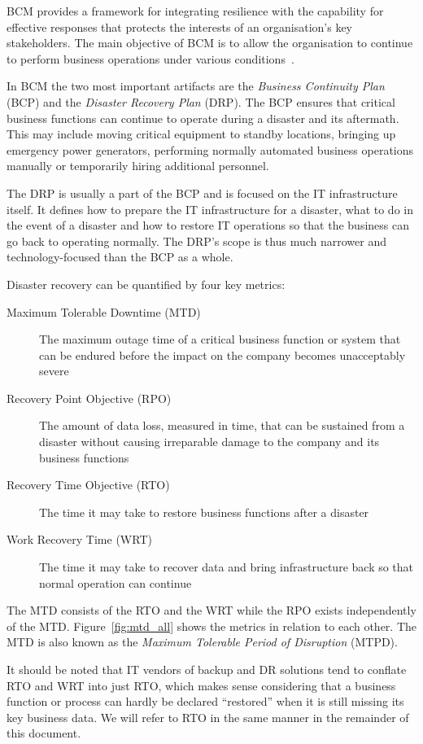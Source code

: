 \documentclass[a4paper,11pt,onecolumn]{scrartcl}
\begin{document}
BCM provides a framework for integrating resilience with the capability
for effective responses that protects the interests of an organisation's
key stakeholders. The main objective of BCM is to allow the organisation
to continue to perform business operations under various
conditions~\cite{harriscissp}.

In BCM the two most important artifacts are the \emph{Business
	Continuity Plan} (BCP) and the \emph{Disaster Recovery Plan} (DRP).
The BCP ensures that critical business functions can continue to operate
during a disaster and its aftermath. This may include moving critical
equipment to standby locations, bringing up emergency power generators,
performing normally automated business operations manually or
temporarily hiring additional personnel.

The DRP is usually a part of the BCP and is focused on the IT
infrastructure itself. It defines how to prepare the IT infrastructure
for a disaster, what to do in the event of a disaster and how to restore
IT operations so that the business can go back to operating normally.
The DRP's scope is thus much narrower and technology-focused than the
BCP as a whole.

Disaster recovery can be quantified by four key metrics:

\begin{description}
	\item[Maximum Tolerable Downtime (MTD)] The maximum outage
		time of a critical business function or system that can be
		endured before the impact on the company becomes unacceptably
		severe
	\item[Recovery Point Objective (RPO)] The amount of data loss,
		measured in time, that can be sustained from a disaster without
		causing irreparable damage to the company and its business
		functions
	\item[Recovery Time Objective (RTO)] The time it may take to restore
		business functions after a disaster
	\item[Work Recovery Time (WRT)] The time it may take to recover data
		and bring infrastructure back so that normal operation can
		continue
\end{description}

The MTD consists of the RTO and the WRT while the RPO exists
independently of the MTD. Figure~\ref{fig:mtd_all} shows the metrics in
relation to each other. The MTD is also known as the \emph{Maximum
	Tolerable Period of Disruption} (MTPD).

It should be noted that IT vendors of backup and DR solutions tend to
conflate RTO and WRT into just RTO, which makes sense considering that a
business function or process can hardly be declared ``restored'' when it
is still missing its key business data. We will refer to RTO in the same
manner in the remainder of this document.
\end{document}
